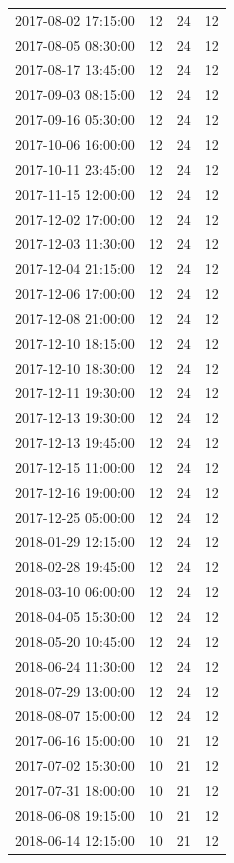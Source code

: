 \begin{tabular}{lrrr}
2017-08-02 17:15:00 & 12 & 24 & 12 \\
2017-08-05 08:30:00 & 12 & 24 & 12 \\
2017-08-17 13:45:00 & 12 & 24 & 12 \\
2017-09-03 08:15:00 & 12 & 24 & 12 \\
2017-09-16 05:30:00 & 12 & 24 & 12 \\
2017-10-06 16:00:00 & 12 & 24 & 12 \\
2017-10-11 23:45:00 & 12 & 24 & 12 \\
2017-11-15 12:00:00 & 12 & 24 & 12 \\
2017-12-02 17:00:00 & 12 & 24 & 12 \\
2017-12-03 11:30:00 & 12 & 24 & 12 \\
2017-12-04 21:15:00 & 12 & 24 & 12 \\
2017-12-06 17:00:00 & 12 & 24 & 12 \\
2017-12-08 21:00:00 & 12 & 24 & 12 \\
2017-12-10 18:15:00 & 12 & 24 & 12 \\
2017-12-10 18:30:00 & 12 & 24 & 12 \\
2017-12-11 19:30:00 & 12 & 24 & 12 \\
2017-12-13 19:30:00 & 12 & 24 & 12 \\
2017-12-13 19:45:00 & 12 & 24 & 12 \\
2017-12-15 11:00:00 & 12 & 24 & 12 \\
2017-12-16 19:00:00 & 12 & 24 & 12 \\
2017-12-25 05:00:00 & 12 & 24 & 12 \\
2018-01-29 12:15:00 & 12 & 24 & 12 \\
2018-02-28 19:45:00 & 12 & 24 & 12 \\
2018-03-10 06:00:00 & 12 & 24 & 12 \\
2018-04-05 15:30:00 & 12 & 24 & 12 \\
2018-05-20 10:45:00 & 12 & 24 & 12 \\
2018-06-24 11:30:00 & 12 & 24 & 12 \\
2018-07-29 13:00:00 & 12 & 24 & 12 \\
2018-08-07 15:00:00 & 12 & 24 & 12 \\
2017-06-16 15:00:00 & 10 & 21 & 12 \\
2017-07-02 15:30:00 & 10 & 21 & 12 \\
2017-07-31 18:00:00 & 10 & 21 & 12 \\
2018-06-08 19:15:00 & 10 & 21 & 12 \\
2018-06-14 12:15:00 & 10 & 21 & 12 \\

\end{tabular}
